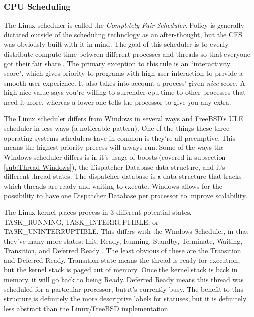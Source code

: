 \documentclass[10pt,draftclsnofoot,onecolumn]{IEEEtran}
\begin{document}
\subsubsection{CPU Scheduling}
\label{sub:CPU Scheduling Linux}
\par The Linux scheduler is called the \textit{Completely Fair Scheduler}.
Policy is generally dictated outside of the scheduling technology as an after-thought, but the CFS was obviously built with it in mind.
The goal of this scheduler is to evenly distribute compute time between different processes and threads so that everyone got their fair share \cite{linux:1}.
The primary exception to this rule is an ``interactivity score", which gives priority to programs with high user interaction to provide a smooth user experience.
It also takes into account a process' given \textit{nice} score.
A high nice value says you're willing to surrender cpu time to other processes that need it more, whereas a lower one tells the processor to give you any extra.

\par The Linux scheduler differs from Windows in several ways and FreeBSD's ULE scheduler in less ways (a noticeable pattern).
One of the things these three operating systems schedulers have in common is they're all preemptive.
This means the highest priority process will always run.
Some of the ways the Windows scheduler differs is in it's usage of boosts (covered in subsection \ref{sub:Thread Windows}), the Dispatcher Database data structure, and it's different thread states.
The dispatcher database is a data structure that tracks which threads are ready and waiting to execute.
Windows allows for the possibility to have one Dispatcher Database per processor to improve scalability.

\par The Linux kernel places process in 3 different potential states. TASK\_RUNNING, TASK\_INTERRUPTIBLE, or TASK\_UNINTERRUPTIBLE.
This differs with the Windows Scheduler, in that they've many more states: Init, Ready, Running, Standby, Terminate, Waiting, Transition, and Deferred Ready \cite{win:1}.
The least obvious of these are the Transition and Deferred Ready.
Transition state means the thread is ready for execution, but the kernel stack is paged out of memory.
Once the kernel stack is back in memory, it will go back to being Ready.
Deferred Ready means this thread was scheduled for a particular processor, but it's currently busy.
The benefit to this structure is definitely the more descriptive labels for statuses, but it is definitely less abstract than the Linux/FreeBSD implementation.\\
\end{document}
